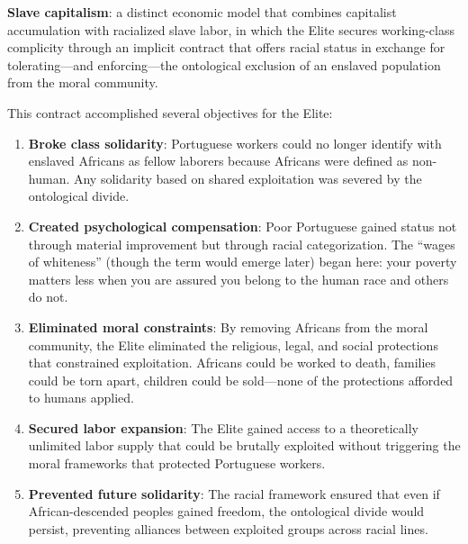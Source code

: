 \documentclass[12pt,openany]{book}
\begin{document}
\begin{definition}
\textbf{Slave capitalism}: a distinct economic model that combines capitalist accumulation with racialized slave labor, in which the Elite secures working-class complicity through an implicit contract that offers racial status in exchange for tolerating---and enforcing---the ontological exclusion of an enslaved population from the moral community.
\end{definition}

This contract accomplished several objectives for the Elite:

\begin{enumerate}
    \item \textbf{Broke class solidarity}: Portuguese workers could no longer identify with enslaved Africans as fellow laborers because Africans were defined as non-human. Any solidarity based on shared exploitation was severed by the ontological divide.
    
    \item \textbf{Created psychological compensation}: Poor Portuguese gained status not through material improvement but through racial categorization. The ``wages of whiteness'' (though the term would emerge later) began here: your poverty matters less when you are assured you belong to the human race and others do not.
    
    \item \textbf{Eliminated moral constraints}: By removing Africans from the moral community, the Elite eliminated the religious, legal, and social protections that constrained exploitation. Africans could be worked to death, families could be torn apart, children could be sold---none of the protections afforded to humans applied.
    
    \item \textbf{Secured labor expansion}: The Elite gained access to a theoretically unlimited labor supply that could be brutally exploited without triggering the moral frameworks that protected Portuguese workers.
    
    \item \textbf{Prevented future solidarity}: The racial framework ensured that even if African-descended peoples gained freedom, the ontological divide would persist, preventing alliances between exploited groups across racial lines.
\end{enumerate}
\end{document}
